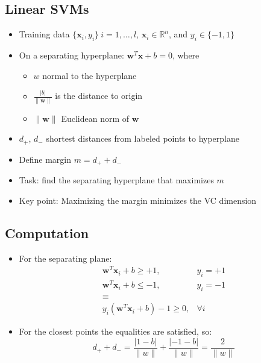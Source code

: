\documentclass[12pt]{article}
\begin{document}
\subsection{Linear SVMs}
  \begin{itemize}
  \item Training data $\{\mathbf x_i, y_i\}\ i = 1,\ldots,l$, 
    $\mathbf    x_i \in \mathbb{R}^n$, and $y_i \in \{ -1, 1\}$
  \item On a separating hyperplane: $\mathbf w^T \mathbf x + b = 0$, where
    \begin{itemize}
    \item $w$ normal to the hyperplane
    \item $\displaystyle\frac{|b|}{\|\mathbf w\|}$ is the distance to origin
    \item $\|\mathbf w\|$ Euclidean norm of $\mathbf w$
    \end{itemize}
  \end{itemize}
  \begin{itemize}
      \item $d_+$, $d_-$ shortest distances from labeled points to hyperplane
  \item Define margin $m = d_+ + d_-$
  \item Task: find the separating hyperplane that maximizes $m$
  \item Key point: Maximizing the margin minimizes the VC dimension
  
  \end{itemize}
  \subsection{Computation}
  \begin{itemize}
  \item For the separating plane:
    \begin{eqnarray}
      \mathbf w^T \mathbf x_i + b \geq +1,& y_i = +1\\
      \mathbf w^T \mathbf x_i + b \leq -1,& y_i = -1\\
      \equiv\\
      y_i(\mathbf w^T \mathbf x_i + b) - 1 \geq 0,& \forall i
    \end{eqnarray}
  \item For the closest points the equalities are satisfied, so:
    \begin{equation}
      d_+ + d_- = \frac{|1-b|}{\|w\|} + \frac{|-1-b|}{\|w\|} = \frac{2}{\|w\|}
    \end{equation}
 
  \end{itemize}
\end{document}
